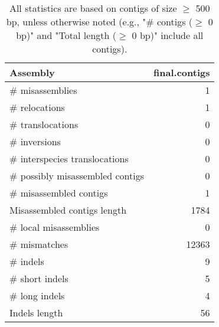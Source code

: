 \documentclass[12pt,a4paper]{article}
\begin{document}
\begin{table}[ht]
\begin{center}
\caption{All statistics are based on contigs of size $\geq$ 500 bp, unless otherwise noted (e.g., "\# contigs ($\geq$ 0 bp)" and "Total length ($\geq$ 0 bp)" include all contigs).}
\begin{tabular}{|l*{1}{|r}|}
\hline
Assembly & final.contigs \\ \hline
\# misassemblies & 1 \\ \hline
\hspace{5mm}\# relocations & 1 \\ \hline
\hspace{5mm}\# translocations & 0 \\ \hline
\hspace{5mm}\# inversions & 0 \\ \hline
\hspace{5mm}\# interspecies translocations & 0 \\ \hline
\# possibly misassembled contigs & 0 \\ \hline
\# misassembled contigs & 1 \\ \hline
Misassembled contigs length & 1784 \\ \hline
\# local misassemblies & 0 \\ \hline
\# mismatches & 12363 \\ \hline
\# indels & 9 \\ \hline
\hspace{5mm}\# short indels & 5 \\ \hline
\hspace{5mm}\# long indels & 4 \\ \hline
Indels length & 56 \\ \hline
\end{tabular}
\end{center}
\end{table}
\end{document}
